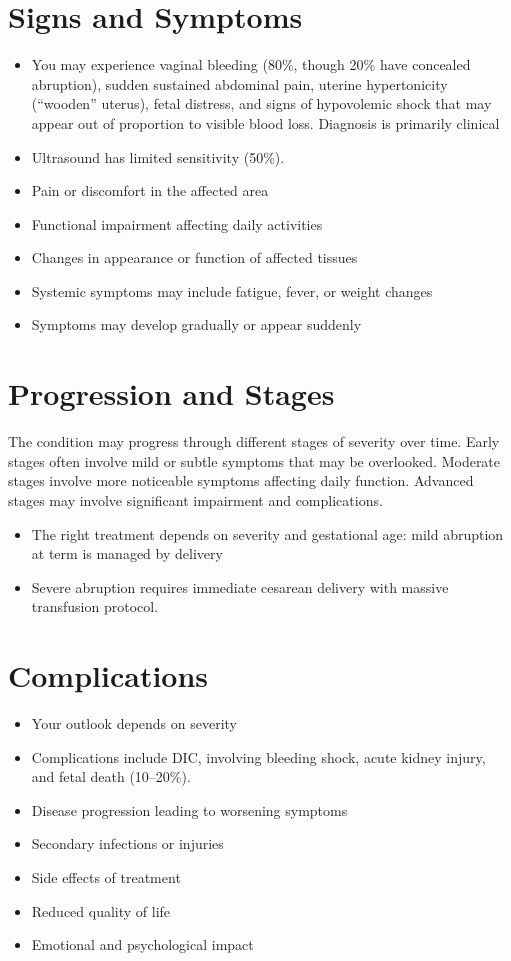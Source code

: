 \section{Signs and Symptoms}
\begin{itemize}[noitemsep]
  \item You may experience vaginal bleeding (80\%, though 20\% have concealed abruption), sudden sustained abdominal pain, uterine hypertonicity (``wooden'' uterus), fetal distress, and signs of hypovolemic shock that may appear out of proportion to visible blood loss. Diagnosis is primarily clinical
  \item Ultrasound has limited sensitivity (50\%).
  \item Pain or discomfort in the affected area
  \item Functional impairment affecting daily activities
  \item Changes in appearance or function of affected tissues
  \item Systemic symptoms may include fatigue, fever, or weight changes
  \item Symptoms may develop gradually or appear suddenly
\end{itemize}
\section{Progression and Stages}
The condition may progress through different stages of severity over time. Early stages often involve mild or subtle symptoms that may be overlooked. Moderate stages involve more noticeable symptoms affecting daily function. Advanced stages may involve significant impairment and complications.

\begin{itemize}[noitemsep]
  \item The right treatment depends on severity and gestational age: mild abruption at term is managed by delivery
  \item Severe abruption requires immediate cesarean delivery with massive transfusion protocol.
\end{itemize}
\section{Complications}
\begin{itemize}[noitemsep]
  \item Your outlook depends on severity
  \item Complications include DIC, involving bleeding shock, acute kidney injury, and fetal death (10--20\%).
  \item Disease progression leading to worsening symptoms
  \item Secondary infections or injuries
  \item Side effects of treatment
  \item Reduced quality of life
  \item Emotional and psychological impact
\end{itemize}

